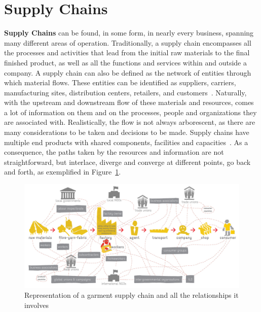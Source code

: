 \section{Supply Chains}
\label{supply_chains}
\textbf{Supply Chains} can be found, in some form, in nearly every business, spanning many different areas of operation. Traditionally, a supply chain encompasses all the processes and activities that lead from the initial raw materials to the final finished product, as well as all the functions and services within and outside a company. A supply chain can also be defined as the network of entities through which material flows. These entities can be identified as suppliers, carriers, manufacturing sites, distribution centers, retailers, and customers~\cite{Lummus2014}. Naturally, with the upstream and downstream flow of these materials and resources, comes a lot of information on them and on the processes, people and organizations they are associated with. Realistically, the  flow is not always arborescent, as there are many considerations to be taken and decisions to be made. Supply chains have multiple end products with shared components, facilities and capacities~\cite{Ganeshan1995}. As a consequence, the paths taken by the resources and information are not straightforward, but interlace, diverge and converge at different points, go back and forth, as exemplified in Figure~\ref{fig:supplychain_complexity}.

  
\begin{figure}[ht]
\centering
\includegraphics[scale=0.18]{media/supplychain_complexity.jpg}
\caption{Representation of a garment supply chain and all the relationships it involves}
\label{fig:supplychain_complexity}
\end{figure}
  
